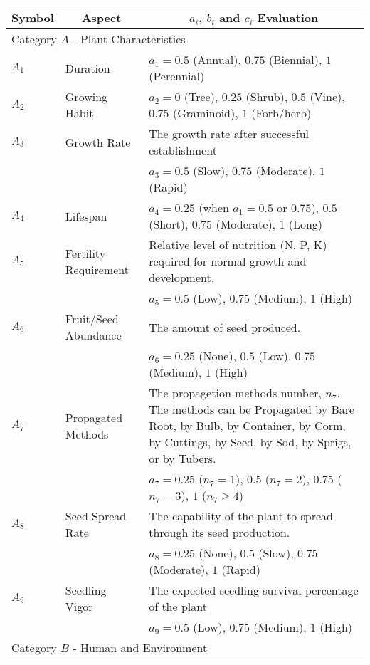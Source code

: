 \documentclass[12pt]{article}
\begin{document}
		{
			\fontsize{10}{13}\selectfont
			{
			\begin{longtable}{p{0.2in}p{1.5in}p{4.3in}}
			
				\toprule
				\multicolumn{1}{c}{\textbf{Symbol}} 
					& \multicolumn{1}{c}{\textbf{Aspect}}
					& \multicolumn{1}{c}{\textbf{$a_i$, $b_i$ and $c_i$ Evaluation}} \\
			
				\toprule
				\multicolumn{3}{l}{Category $A$ - Plant Characteristics}\\
				\midrule
				
				$A_1$ & Duration & $a_1=0.5$ (Annual), $0.75$ (Biennial), $1$ (Perennial)\\
				$A_2$ & Growing Habit & $a_2=0$ (Tree), $0.25$ (Shrub), $0.5$ (Vine), $0.75$ (Graminoid), $1$ (Forb/herb)\\ 
				$A_3$ & Growth Rate & The growth rate after successful establishment\\
					&& $a_3=0.5$ (Slow), $0.75$ (Moderate), $1$ (Rapid)\\
				$A_4$ & Lifespan & $a_4=0.25$ (when $a_1=0.5$ or $0.75$), $0.5$ (Short), $0.75$ (Moderate), $1$ (Long) \\
				$A_5$ & Fertility Requirement & Relative level of nutrition (N, P, K) required for normal growth and development.\\
					 && $a_5=0.5$ (Low), $0.75$ (Medium), $1$ (High)\\
				$A_6$ & Fruit/Seed Abundance & The amount of seed produced.\\
					&& $a_6=0.25$ (None), $0.5$ (Low), $0.75$ (Medium), $1$ (High)\\
				$A_7$ & Propagated Methods & The propagetion methods number, $n_7$. The methods can be Propagated by Bare Root, by Bulb, by Container, by Corm, by Cuttings, by Seed, by Sod, by Sprigs, or by Tubers. \\
					&& $a_7=0.25$ ($n_7=1$), $0.5$ ($n_7=2$), $0.75$ ($n_7=3$), $1$ ($n_7\geq4$)\\
				$A_8$ & Seed Spread Rate & The capability of the plant to spread through its seed production.\\
					&& $a_8=0.25$ (None), $0.5$ (Slow), $0.75$ (Moderate), $1$ (Rapid)\\
				$A_9$ & Seedling Vigor & The expected seedling survival percentage of the plant\\
					&& $a_9=0.5$ (Low), $0.75$ (Medium), $1$ (High)\\
				
				\midrule
				\multicolumn{3}{l}{Category $B$ - Human and Environment}  \\
				\midrule
				

\end{longtable}}}
\end{document}
